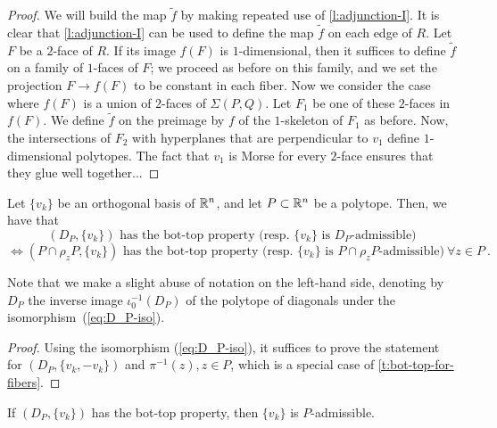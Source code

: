 \begin{proof}
	We will build the map $\tilde f$ by making repeated use of \cref{l:adjunction-I}. 
	It is clear that \cref{l:adjunction-I} can be used to define the map $\tilde f$ on each edge of $R$. 
	Let $F$ be a $2$-face of $R$. 
	If its image $f(F)$ is $1$-dimensional, then it suffices to define $\tilde f$ on a family of $1$-faces of $F$; we proceed as before on this family, and we set the projection $F \to f(F)$ to be constant in each fiber. 
	Now we consider the case where $f(F)$ is a union of $2$-faces of $\Sigma(P,Q)$. 
	Let $F_1$ be one of these $2$-faces in $f(F)$. 
	We define $\tilde f$ on the preimage by $f$ of the $1$-skeleton of $F_1$ as before. 
	Now, the intersections of $F_2$ with hyperplanes that are perpendicular to $v_1$ define $1$-dimensional polytopes. 
	The fact that $v_1$ is Morse for every $2$-face ensures that they glue well together...
\end{proof}

\begin{lemma} \label{l:bot-top-for-DP}
	Let $\{v_k\}$ be an orthogonal basis of $\mathbb{R}^n$, and let $P\subset \mathbb{R}^n$ be a polytope.
	Then, we have that
	\[
	(D_P,\{v_k\}) \text{ has the bot-top property (resp. } \{v_k\} \text{ is }D_P\text{-admissible)}
	\]
	\[
	\iff (P\cap \rho_z P,\{v_k\}) \text{ has the bot-top property (resp. } \{v_k\} \text{ is }P\cap \rho_z P\text{-admissible)} \ \forall z \in P \ .
	\]
\end{lemma}

Note that we make a slight abuse of notation on the left-hand side, denoting by $D_P$ the inverse image $\iota_0^{-1}(D_P)$ of the polytope of diagonals under the isomorphism~(\ref{eq:D_P-iso}).

\begin{proof}
	Using the isomorphism (\ref{eq:D_P-iso}), it suffices to prove the statement for $(D_P,\{v_k,-v_k\})$ and $\pi^{-1}(z), z \in P$, which is a special case of \cref{t:bot-top-for-fibers}.
\end{proof}

\begin{theorem}
	If $(D_P,\{v_k\})$ has the bot-top property, then $\{v_k\}$ is $P$-admissible.
\end{theorem}

